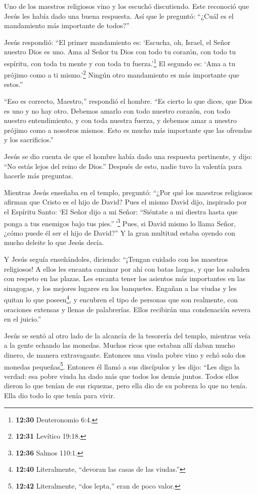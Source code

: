  Uno de los maestros religiosos vino y los escuchó
discutiendo. Este reconoció que Jesús les había dado una buena
respuesta. Así que le preguntó: ``¿Cuál es el mandamiento más importante
de todos?''

 Jesús respondió: ``El primer mandamiento es: `Escucha, oh,
Israel, el Señor nuestro Dios es uno.  Ama al Señor tu Dios
con todo tu corazón, con todo tu espíritu, con toda tu mente y con toda
tu fuerza.'\footnote{\textbf{12:30} Deuteronomio 6:4.}  El
segundo es: `Ama a tu prójimo como a ti mismo.'\footnote{\textbf{12:31}
  Levítico 19:18.} Ningún otro mandamiento es más importante que
estos.''

 ``Eso es correcto, Maestro,'' respondió el hombre. ``Es
cierto lo que dices, que Dios es uno y no hay otro. 
Debemos amarlo con todo nuestro corazón, con todo nuestro entendimiento,
y con toda nuestra fuerza, y debemos amar a nuestro prójimo como a
nosotros mismos. Esto es mucho más importante que las ofrendas y los
sacrificios.''

 Jesús se dio cuenta de que el hombre había dado una
respuesta pertinente, y dijo: ``No estás lejos del reino de Dios.''
Después de esto, nadie tuvo la valentía para hacerle más preguntas.

 Mientras Jesús enseñaba en el templo, preguntó: ``¿Por qué
los maestros religiosos afirman que Cristo es el hijo de David?
 Pues el mismo David dijo, inspirado por el Espíritu Santo:
`El Señor dijo a mi Señor: ``Siéntate a mi diestra hasta que ponga a tus
enemigos bajo tus pies.''\,'\footnote{\textbf{12:36} Salmos 110:1.}
 Pues, si David mismo lo llama Señor, ¿cómo puede él ser el
hijo de David?'' Y la gran multitud estaba oyendo con mucho deleite lo
que Jesús decía.

 Y Jesús seguía enseñándoles, diciendo: ``¡Tengan cuidado
con los maestros religiosos! A ellos les encanta caminar por ahí con
batas largas, y que los saluden con respeto en las plazas. 
Les encanta tener los asientos más importantes en las sinagogas, y los
mejores lugares en los banquetes.  Engañan a las viudas y
les quitan lo que poseen\footnote{\textbf{12:40} Literalmente, ``devoran
  las casas de las viudas.''}, y encubren el tipo de personas que son
realmente, con oraciones extensas y llenas de palabrerías. Ellos
recibirán una condenación severa en el juicio.''

 Jesús se sentó al otro lado de la alcancía de la tesorería
del templo, mientras veía a la gente echando las monedas. Muchos ricos
que estaban allí daban mucho dinero, de manera extravagante.
 Entonces una viuda pobre vino y echó solo dos monedas
pequeñas\footnote{\textbf{12:42} Literalmente, ``dos lepta,'' eran de
  poco valor.}.  Entonces él llamó a sus discípulos y les
dijo: ``Les digo la verdad: esa pobre viuda ha dado más que todos los
demás juntos.  Todos ellos dieron lo que tenían de sus
riquezas, pero ella dio de su pobreza lo que no tenía. Ella dio todo lo
que tenía para vivir.

